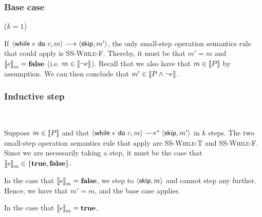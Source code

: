 \documentclass[10pt]{article}
\theoremstyle{definition}
\begin{document}
\subsubsection*{Base case} ($k = 1$)

\noindent
If $\Cfg(\While e do c, m) \sstepsto \Cfg(\Skip, m')$, the only small-step operation semantics rule 
that could apply is \textsc{SS-While-F}.
Thereby, it must be that $m' = m$ and $\Eval(e, m) = \False$ (i.e. $m \in \left\llbracket \neg e \right\rrbracket$).
Recall that we also have that $m \in \left\llbracket P \right\rrbracket$ by assumption.
We can then conclude that $m' \in \left\llbracket P \wedge \neg e \right\rrbracket$.

\subsubsection*{Inductive step}\

\noindent
Suppose $m \in \left\llbracket P \right\rrbracket$ and that $\Cfg(\While e do c, m) \sstepstotrans \Cfg(\Skip, m')$ in $k$ steps.
The two small-step operation semantics rule that apply are \textsc{SS-While-T} and \textsc{SS-While-F}.
Since we are necessarily taking a step, it must be the case that $\Eval(e, m) \in \{\True, \False\}$.

In the case that $\Eval(e, m) = \False$, we step to $\Cfg(\Skip, m)$ and cannot step any further.
Hence, we have that $m' = m$, and the base case applies.

In the case that $\Eval(e, m) = \True$, 



\end{document}
